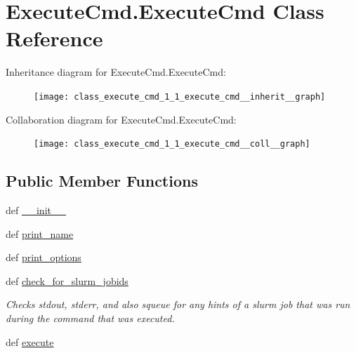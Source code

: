 \hypertarget{class_execute_cmd_1_1_execute_cmd}{\section{Execute\-Cmd.\-Execute\-Cmd Class Reference}
\label{class_execute_cmd_1_1_execute_cmd}
}


Inheritance diagram for Execute\-Cmd.\-Execute\-Cmd\-:
\nopagebreak
\begin{figure}[H]
\begin{center}
\leavevmode
\texttt{[image: class\_execute\_cmd\_1\_1\_execute\_cmd\_\_inherit\_\_graph]}
\end{center}
\end{figure}


Collaboration diagram for Execute\-Cmd.\-Execute\-Cmd\-:
\nopagebreak
\begin{figure}[H]
\begin{center}
\leavevmode
\texttt{[image: class\_execute\_cmd\_1\_1\_execute\_cmd\_\_coll\_\_graph]}
\end{center}
\end{figure}
\subsection*{Public Member Functions}
\begin{DoxyCompactItemize}
\item 
def \hyperlink{class_execute_cmd_1_1_execute_cmd_ae0e361beb27aac47f2c682418577b375}{\-\_\-\-\_\-init\-\_\-\-\_\-}
\item 
def \hyperlink{class_execute_cmd_1_1_execute_cmd_a9021ad1c3f3ed4460d57d42a8d1f23ef}{print\-\_\-name}
\item 
def \hyperlink{class_execute_cmd_1_1_execute_cmd_a8174353fba2a214e50529b2612e078ff}{print\-\_\-options}
\item 
def \hyperlink{class_execute_cmd_1_1_execute_cmd_ab9a1071eef85698e5d9c0be270d76fd1}{check\-\_\-for\-\_\-slurm\-\_\-jobids}
\begin{DoxyCompactList}\small\item\em Checks stdout, stderr, and also squeue for any hints of a slurm job that was run during the command that was executed. \end{DoxyCompactList}\item 
def \hyperlink{class_execute_cmd_1_1_execute_cmd_abd51ca569e60d044fe278b613459c709}{execute}
\end{DoxyCompactItemize}
